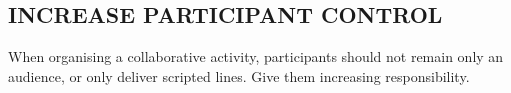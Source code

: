 \subsection*{\normalsize{} INCREASE PARTICIPANT CONTROL {\hfill \motor}}

When organising a collaborative activity, participants should not
remain only an audience, or only deliver scripted lines.  Give them
increasing responsibility.
